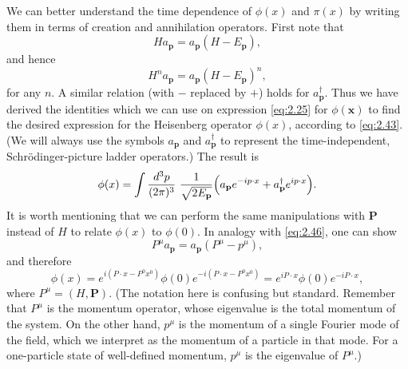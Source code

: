 We can better understand the time dependence of $\phi(x)$ and $\pi(x)$ by
writing them in terms of creation and annihilation operators.  First note
that
\begin{equation}
  Ha_{\mathbf{p}} = a_{\mathbf{p}}(H - E_{\mathbf{p}}),
  \label{eq:2.46}
\end{equation}
and hence
\begin{equation}
  H^n a_{\mathbf{p}} = a_{\mathbf{p}}(H - E_{\mathbf{p}})^n,
\end{equation}
for any $n$.  A similar relation (with $-$ replaced by $+$) holds for
$a_{\mathbf{p}}^\dagger$.  Thus we have derived the identities
which we can use on expression \eqref{eq:2.25} for $\phi(\mathbf{x})$ to
find the desired expression for the Heisenberg operator $\phi(x)$,
according to \eqref{eq:2.43}.  (We will always use the symbols
$a_{\mathbf{p}}$ and $a_{\mathbf{p}}^\dagger$ to represent the
time-independent, Schr\"odinger-picture ladder operators.)  The result is
\begin{equation}
  \phi(x) = \int \frac{d^3p}{(2\pi)^3}\ \frac{1}{\sqrt{2E_{\mathbf{p}}}}
    \Bigl( a_{\mathbf{p}}e^{-ip\cdot x}
      + a_{\mathbf{p}}^\dagger e^{ip\cdot x} \Bigr).
  \label{eq:2.47}
\end{equation}
It is worth mentioning that we can perform the same manipulations with
$\mathbf{P}$ instead of $H$ to relate $\phi(x)$ to $\phi(0)$.  In analogy
with \eqref{eq:2.46}, one can show
\begin{equation}
  P^\mu a_{\mathbf{p}} = a_{\mathbf{p}}(P^\mu - p^\mu),
  \label{eq:2.48}
\end{equation}
and therefore
\begin{equation}
  \phi(x) = e^{i(P\cdot x - P^0 x^0)}\phi(0)e^{-i(P\cdot x - P^0x^0)}
  = e^{iP\cdot x}\phi(0)e^{-iP\cdot x},
  \label{eq:2.49}
\end{equation}
where $P^\mu = (H, \mathbf{P})$.  (The notation here is confusing but
standard.  Remember that $P^\mu$ is the momentum operator, whose eigenvalue
is the total momentum of the system.  On the other hand, $p^\mu$ is the
momentum of a single Fourier mode of the field, which we interpret as the
momentum of a particle in that mode.  For a one-particle state of
well-defined momentum, $p^\mu$ is the eigenvalue of $P^\mu$.)

